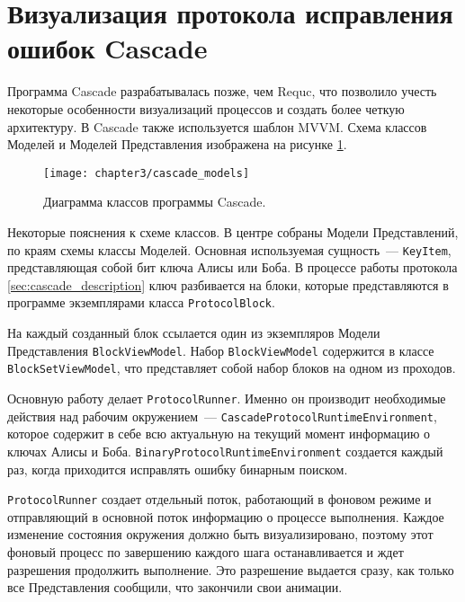 \section{Визуализация протокола исправления ошибок Cascade}
Программа Cascade разрабатывалась позже, чем Requc, что позволило учесть некоторые особенности визуализаций процессов и создать более четкую архитектуру.
В Cascade также используется шаблон MVVM. Схема классов Моделей и Моделей Представления изображена на рисунке \ref{fig:cascade_models}.
\begin{figure}[h]
  \texttt{[image: chapter3/cascade\_models]}
  \caption{Диаграмма классов программы Cascade.}
  \label{fig:cascade_models}
\end{figure}

Некоторые пояснения к схеме классов. В центре собраны Модели Представлений, по краям схемы классы Моделей.
Основная используемая сущность~--- \texttt{KeyItem}, представляющая собой бит ключа Алисы или Боба.
В процессе работы протокола \ref{sec:cascade_description} ключ разбивается на блоки, которые представляются в программе экземплярами класса \texttt{ProtocolBlock}.

На каждый созданный блок ссылается один из экземпляров Модели Представления \texttt{BlockViewModel}. Набор \texttt{BlockViewModel} содержится в классе \texttt{BlockSetViewModel}, что представляет собой набор блоков на одном из проходов. 

Основную работу делает \texttt{ProtocolRunner}. Именно он производит необходимые действия над рабочим окружением~--- \texttt{CascadeProtocolRuntimeEnvironment}, которое содержит в себе всю актуальную на текущий момент информацию о ключах Алисы и Боба. \texttt{BinaryProtocolRuntimeEnvironment} создается каждый раз, когда приходится исправлять ошибку бинарным поиском.

\texttt{ProtocolRunner} создает отдельный поток, работающий в фоновом режиме и отправляющий в основной поток информацию о процессе выполнения. Каждое изменение состояния окружения должно быть визуализировано, поэтому этот фоновый процесс по завершению каждого шага останавливается и ждет разрешения продолжить выполнение. Это разрешение выдается сразу, как только все Представления сообщили, что закончили свои анимации. 

